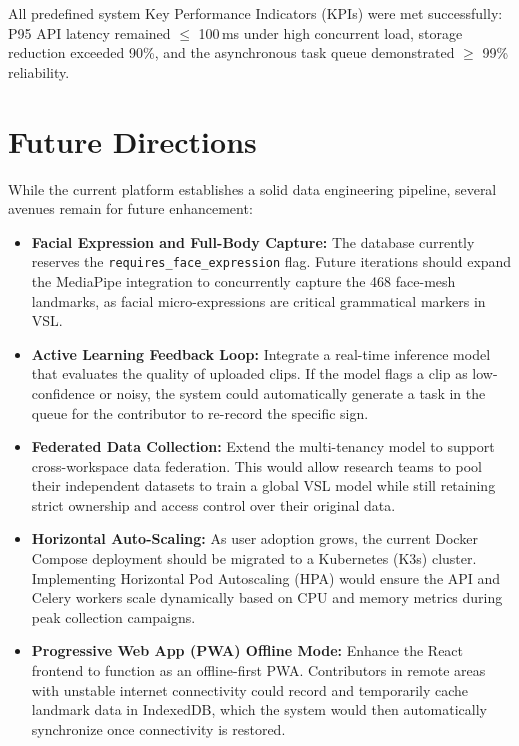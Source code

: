 All predefined system Key Performance Indicators (KPIs) were met successfully: P95 API latency remained $\leq$ 100\,ms under high concurrent load, storage reduction exceeded 90\%, and the asynchronous task queue demonstrated $\geq$ 99\% reliability.

\section{Future Directions}

While the current platform establishes a solid data engineering pipeline, several avenues remain for future enhancement:

\begin{itemize}
    \item \textbf{Facial Expression and Full-Body Capture:} The database currently reserves the \texttt{requires\_face\_expression} flag. Future iterations should expand the MediaPipe integration to concurrently capture the 468 face-mesh landmarks, as facial micro-expressions are critical grammatical markers in VSL.
    \item \textbf{Active Learning Feedback Loop:} Integrate a real-time inference model that evaluates the quality of uploaded clips. If the model flags a clip as low-confidence or noisy, the system could automatically generate a task in the queue for the contributor to re-record the specific sign.
    \item \textbf{Federated Data Collection:} Extend the multi-tenancy model to support cross-workspace data federation. This would allow research teams to pool their independent datasets to train a global VSL model while still retaining strict ownership and access control over their original data.
    \item \textbf{Horizontal Auto-Scaling:} As user adoption grows, the current Docker Compose deployment should be migrated to a Kubernetes (K3s) cluster. Implementing Horizontal Pod Autoscaling (HPA) would ensure the API and Celery workers scale dynamically based on CPU and memory metrics during peak collection campaigns.
    \item \textbf{Progressive Web App (PWA) Offline Mode:} Enhance the React frontend to function as an offline-first PWA. Contributors in remote areas with unstable internet connectivity could record and temporarily cache landmark data in IndexedDB, which the system would then automatically synchronize once connectivity is restored.
\end{itemize}
